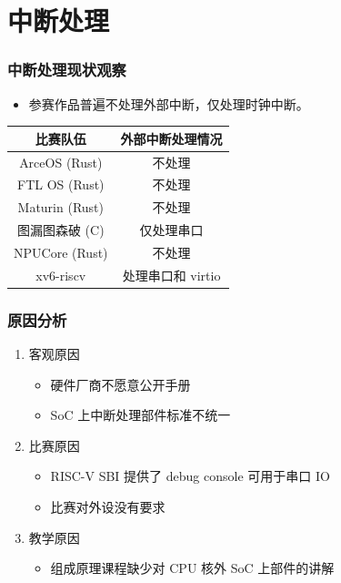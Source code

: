 \section{中断处理}

\begin{frame}
    \frametitle{中断处理现状观察}

    \begin{itemize}
        \item 参赛作品普遍不处理外部中断，仅处理时钟中断。
    \end{itemize}

    \begin{table}
        \centering
        \begin{tabular}{|c|c|}
            \hline \textbf{比赛队伍}               & \textbf{外部中断处理情况} \\
            \hline ArceOS (Rust)        & 不处理               \\
            \hline FTL OS (Rust) & 不处理               \\
            \hline Maturin (Rust)       & 不处理               \\
            \hline 图漏图森破 (C)        & 仅处理串口             \\
            \hline NPUCore (Rust)     & 不处理               \\
            \hline xv6-riscv             & 处理串口和 virtio      \\
            \hline
        \end{tabular}
    \end{table}


\end{frame}

\begin{frame}
    \frametitle{原因分析}

    \begin{enumerate}
        \item 客观原因
              \begin{itemize}
                  \item 硬件厂商不愿意公开手册
                  \item SoC 上中断处理部件标准不统一
              \end{itemize}
        \item 比赛原因
              \begin{itemize}
                  \item RISC-V SBI 提供了 debug console 可用于串口 IO
                  \item 比赛对外设没有要求
              \end{itemize}
        \item 教学原因
              \begin{itemize}
                  \item 组成原理课程缺少对 CPU 核外 SoC 上部件的讲解
              \end{itemize}
    \end{enumerate}


\end{frame}



